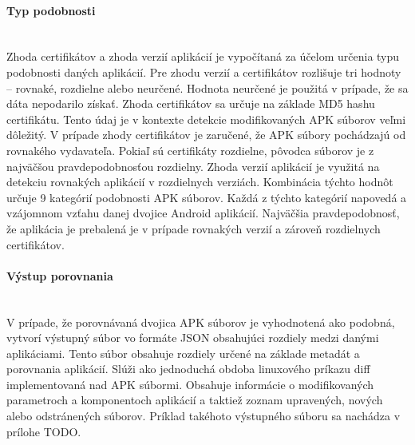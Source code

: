 \paragraph{Typ podobnosti}\mbox{}\\
Zhoda certifikátov a zhoda verzií aplikácií je vypočítaná za účelom určenia typu podobnosti daných aplikácií. Pre zhodu verzií a certifikátov rozlišuje tri hodnoty – rovnaké, rozdielne alebo neurčené. Hodnota neurčené je použitá v prípade, že sa dáta nepodarilo získať. Zhoda certifikátov sa určuje na základe MD5 hashu certifikátu. Tento údaj je v kontexte detekcie modifikovaných APK súborov veľmi dôležitý. V prípade zhody certifikátov je zaručené, že APK súbory pochádzajú od rovnakého vydavateľa. Pokiaľ sú certifikáty rozdielne, pôvodca súborov je z najväčšou pravdepodobnosťou rozdielny. Zhoda verzií aplikácií je využitá na detekciu rovnakých aplikácií v rozdielnych verziách.
 Kombinácia týchto hodnôt určuje 9 kategórií podobnosti APK súborov. Každá z týchto kategórií napovedá a vzájomnom vzťahu danej dvojice Android aplikácií. Najväčšia pravdepodobnosť, že aplikácia je prebalená je v prípade rovnakých verzií a zároveň rozdielnych certifikátov. 

\paragraph{Výstup porovnania}\mbox{}\\
V prípade, že porovnávaná dvojica APK súborov je vyhodnotená ako podobná,  vytvorí výstupný súbor vo formáte JSON obsahujúci rozdiely medzi danými aplikáciami.  Tento súbor obsahuje rozdiely určené na základe metadát a porovnania aplikácií. Slúži ako jednoduchá obdoba linuxového príkazu diff implementovaná nad APK súbormi. Obsahuje informácie o modifikovaných parametroch a komponentoch aplikácií a taktiež zoznam upravených, nových alebo odstránených súborov.  Príklad takéhoto výstupného súboru sa nachádza v prílohe TODO.
